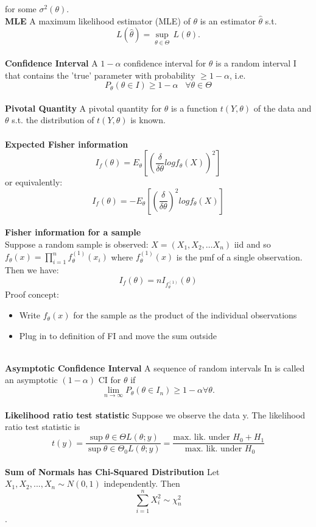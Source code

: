 \documentclass{article}
\begin{document}
for some $\sigma^2(\theta)$.
\\
\textbf{MLE}
A maximum likelihood estimator (MLE) of $\theta$ is an estimator $\hat{\theta}$ s.t. $$L(\hat{\theta}) = \underset{\theta \in \Theta}{\sup} \hspace{2pt} L(\theta).$$
\\
\textbf{Confidence Interval}
A $1 - \alpha$ confidence interval for $\theta$ is a random interval I that contains the ’true’ parameter
with probability $\geq 1 - \alpha$, i.e.
$$P_\theta(\theta \in I) \geq 1 - \alpha \hspace{10pt} \forall \theta \in \Theta$$
\\
\textbf{Pivotal Quantity}
 A pivotal quantity for $\theta$ is a function $t(Y, \theta)$ of the data and $\theta$ s.t. the distribution of $t(Y, \theta)$ is known.
 \\
 \\
 \textbf{Expected Fisher information}
 $$
 I_f (\theta) = E_\theta [ (\frac{\delta}{\delta \theta} log f_\theta (X))^2]
 $$
 or equivalently:
 $$
  I_f(\theta) = - E_\theta [(\frac{\delta}{\delta \theta})^2 log f_\theta (X) ]
 $$
 \\
 \textbf{Fisher information for a sample} \\
 Suppose a random sample is observed: $X = (X_1, X_2, \dots X_n)$ iid and so $f_\theta (x) = \prod_{i=1}^n f_\theta^{(1)} (x_i)$ where $f_\theta^{(1)} (x)$ is the pmf of a single observation. Then we have:
 $$
 I_f (\theta) = nI_{f_\theta^{(1)}} (\theta)
 $$
 Proof concept:
 \begin{itemize}
     \item Write $f_\theta (x)$ for the sample as the product of the individual observations
     \item Plug in to definition of FI and move the sum outside
 \end{itemize}
 \\
 \textbf{Asymptotic Confidence Interval}
 A sequence of random intervals In is called an asymptotic $(1 - \alpha)$ CI for $\theta$ if
$$\underset{n \to \infty}{\lim} P_\theta(\theta \in I_n)\geq 1 - \alpha \forall \theta. $$
\\
\textbf{Likelihood ratio test statistic}
Suppose we observe the data y. The likelihood ratio test statistic is $$t(y) = \frac{\sup \theta \in \Theta L(\theta; y)}{\sup \theta \in \Theta_0 L(\theta; y)} = \frac{\text{max. lik. under }H_0 + H_1}{\text{ max. lik. under } H_0} $$
\\
\textbf{Sum of Normals has Chi-Squared Distribution}
Let $X_1, X_2, ... , X_n \sim N(0, 1)$ independently. Then $$\sum^n_{i=1} X_i^2 \sim \chi^2_n$$.
\end{document}
